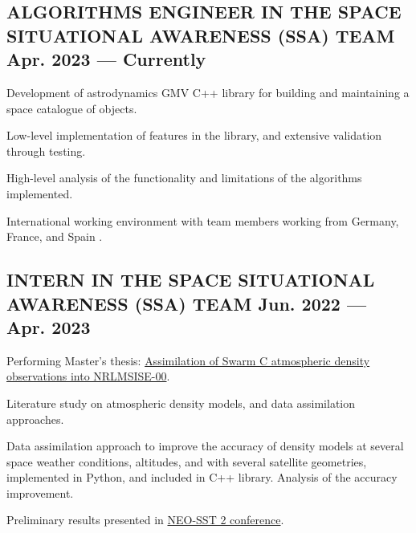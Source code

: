 \documentclass[letter,10pt]{article}
\begin{document}
\subsection{{ALGORITHMS ENGINEER IN THE SPACE SITUATIONAL AWARENESS (SSA) TEAM \hfill Apr. 2023  --- Currently}}
\begin{zitemize}
\item Development of astrodynamics GMV C++ library for building and maintaining a space catalogue of objects.
\begin{zitemize}
    \item Low-level implementation of features in the library, and extensive validation through testing.
    \item High-level analysis of the functionality and limitations of the algorithms implemented.
    \item International working environment with team members working from Germany, France, and Spain .
\end{zitemize}
\end{zitemize}
\subsection{{INTERN IN THE SPACE SITUATIONAL AWARENESS (SSA) TEAM \hfill Jun. 2022  --- Apr. 2023}}
\begin{zitemize}
\item Performing Master's thesis: \href{https://repository.tudelft.nl/islandora/object/uuid:f472201e-0e32-4b9e-8aa3-04521908396a}{Assimilation of Swarm C atmospheric density observations into NRLMSISE-00}.
\begin{zitemize}
    \item Literature study on atmospheric density models, and data assimilation approaches.
    \item Data assimilation approach to improve the accuracy of density models at several space weather conditions, altitudes, and with several satellite geometries, implemented in Python, and included in C++ library. Analysis of the accuracy improvement.
    \item Preliminary results presented in \href{https://conference.sdo.esoc.esa.int/proceedings/neosst2/paper/90/NEOSST2-paper90.pdf}{NEO-SST 2 conference}.
\end{zitemize}
\end{zitemize}
\end{document}
